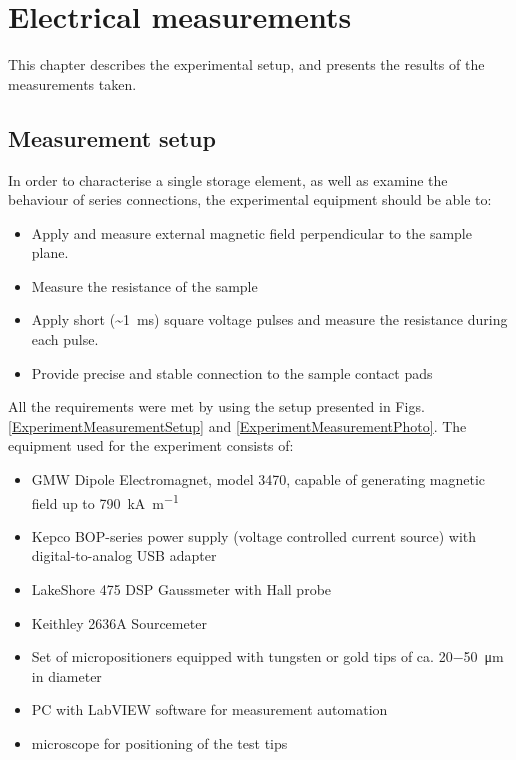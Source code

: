 \chapter{Electrical measurements}
\label{sec:Experiment}

    This chapter describes the experimental setup, and presents the results of the measurements taken.
    
\section{Measurement setup} \label{sec:ExperimentMeasurementSetup}

    In order to characterise a single storage element, as well as examine the behaviour of series connections, the experimental equipment should be able to:
    \begin{itemize}[noitemsep,label=\textbullet]
    	\item Apply and measure external magnetic field perpendicular to the sample plane.
    	\item Measure the resistance of the sample
    	\item Apply short (\textasciitilde\SI{1}{\milli\second}) square voltage pulses and measure the resistance during each pulse.
    	\item Provide precise and stable connection to the sample contact pads
    \end{itemize}
    
    All the requirements were met by using the setup presented in Figs. \ref{ExperimentMeasurementSetup} and \ref{ExperimentMeasurementPhoto}. The equipment used for the experiment consists of:
    
    \begin{itemize}[noitemsep,label=\textbullet]
    	\item GMW Dipole Electromagnet, model 3470, capable of generating magnetic field up to \SI[per-mode=symbol]{790}{\kilo\ampere\per\metre}
    	\item Kepco BOP-series power supply (voltage controlled current source) with digital-to-analog USB adapter
    	\item LakeShore 475 DSP Gaussmeter with Hall probe
    	\item Keithley 2636A Sourcemeter
    	\item Set of micropositioners equipped with tungsten or gold tips of ca.  \SI[parse-numbers = false, number-math-rm = \ensuremath]{20-50}{\micro\metre} in diameter
    	\item PC with LabVIEW software for measurement automation
    	\item microscope for positioning of the test tips
    \end{itemize}
    
